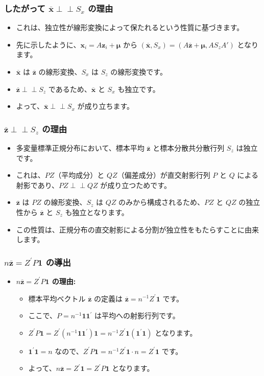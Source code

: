 \documentclass[aspectratio=169]{beamer}
\begin{document}
\begin{frame}
\frametitle{したがって $\overline{\bm{x}}\perp\!\!\!\perp S_x$ の理由}
\begin{itemize}
    \item これは、独立性が線形変換によって保たれるという性質に基づきます。
    \item 先に示したように、$\bm{x}_i = A\bm{z}_i + \bm{\mu}$ から $(\overline{\bm{x}}, S_x) = (A\overline{\bm{z}} + \bm{\mu}, A S_z A')$ となります。
    \item $\overline{\bm{x}}$ は $\overline{\bm{z}}$ の線形変換、$S_x$ は $S_z$ の線形変換です。
    \item $\overline{\bm{z}} \perp\!\!\!\perp S_z$ であるため、$\overline{\bm{x}}$ と $S_x$ も独立です。
    \item よって、$\overline{\bm{x}} \perp\!\!\!\perp S_x$ が成り立ちます。
\end{itemize}
\end{frame}

\begin{frame}
\frametitle{$\overline{\bm{z}}\perp\!\!\!\perp S_z$ の理由}
\begin{itemize}
    \item 多変量標準正規分布において、標本平均 $\overline{\bm{z}}$ と標本分散共分散行列 $S_z$ は独立です。
    \item これは、$PZ$（平均成分）と $QZ$（偏差成分）が直交射影行列 $P$ と $Q$ による射影であり、$PZ \perp\!\!\!\perp QZ$ が成り立つためです。
    \item $\overline{\bm{z}}$ は $PZ$ の線形変換、$S_z$ は $QZ$ のみから構成されるため、$PZ$ と $QZ$ の独立性から $\overline{\bm{z}}$ と $S_z$ も独立となります。
    \item この性質は、正規分布の直交射影による分割が独立性をもたらすことに由来します。
\end{itemize}
\end{frame}

\begin{frame}
\frametitle{$n\overline{\bm{z}}=Z^{\prime}P\bm{1}$ の導出}
\begin{itemize}
    \item \textbf{$n\overline{\bm{z}}=Z^{\prime}P\bm{1}$ の理由:}
    \begin{itemize}
        \item 標本平均ベクトル $\overline{\bm{z}}$ の定義は $\overline{\bm{z}} = n^{-1}Z^{\prime}\bm{1}$ です。
        \item ここで、$P = n^{-1}\bm{1}\bm{1}^{\prime}$ は平均への射影行列です。
        \item $Z^{\prime}P\bm{1} = Z^{\prime}(n^{-1}\bm{1}\bm{1}^{\prime})\bm{1} = n^{-1}Z^{\prime}\bm{1}(\bm{1}^{\prime}\bm{1})$ となります。
        \item $\bm{1}^{\prime}\bm{1} = n$ なので、$Z^{\prime}P\bm{1} = n^{-1}Z^{\prime}\bm{1} \cdot n = Z^{\prime}\bm{1}$ です。
        \item よって、$n\overline{\bm{z}} = Z^{\prime}\bm{1} = Z^{\prime}P\bm{1}$ となります。
    \end{itemize}
\end{itemize}
\end{frame}
\end{document}
